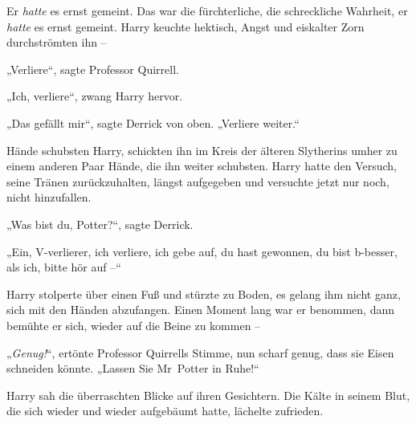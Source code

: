 Er \emph{hatte} es ernst gemeint. Das war die fürchterliche, die schreckliche Wahrheit, er \emph{hatte} es ernst gemeint. Harry keuchte hektisch, Angst und eiskalter Zorn durchströmten ihn –

„Verliere“, sagte Professor Quirrell.

„Ich, verliere“, zwang Harry hervor.

„Das gefällt mir“, sagte Derrick von oben. „Verliere weiter.“

\later

Hände schubsten Harry, schickten ihn im Kreis der älteren Slytherins umher zu einem anderen Paar Hände, die ihn weiter schubsten. Harry hatte den Versuch, seine Tränen zurückzuhalten, längst aufgegeben und versuchte jetzt nur noch, nicht hinzufallen.

„Was bist du, Potter?“, sagte Derrick.

„Ein, V-verlierer, ich verliere, ich gebe auf, du hast gewonnen, du bist b-besser, als ich, bitte hör auf –“

Harry stolperte über einen Fuß und stürzte zu Boden, es gelang ihm nicht ganz, sich mit den Händen abzufangen. Einen Moment lang war er benommen, dann bemühte er sich, wieder auf die Beine zu kommen –

„\emph{Genug!}“, ertönte Professor Quirrells Stimme, nun scharf genug, dass sie Eisen schneiden könnte. „Lassen Sie Mr~Potter in Ruhe!“

Harry sah die überraschten Blicke auf ihren Gesichtern. Die Kälte in seinem Blut, die sich wieder und wieder aufgebäumt hatte, lächelte zufrieden.

